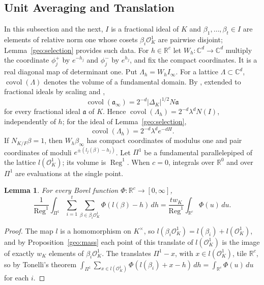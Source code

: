 \documentclass[11pt]{amsart}
\numberwithin{equation}{section}
\newtheorem{lemma}[equation]{Lemma}
\theoremstyle{definition}
\theoremstyle{remark}
\DeclareMathOperator{\covol}{covol}
\newcommand{\R}{\mathbb R}
\newcommand{\C}{\mathbb C}
\begin{document}
\subsection{Unit Averaging and Translation}
In this subsection and the next, $I$ is a fractional ideal of $K$ and
$\beta_1,\dots,\beta_t\in I$ are elements of relative norm one whose
cosets $\beta_i\mathcal O_K^1$ are pairwise disjoint;
Lemma~\ref{geo:selection} provides such data. For $h\in\R^c$ let
$W_h\colon\C^d\to\C^d$ multiply the coordinate $\phi_j^+$ by
$e^{-h_j}$ and $\phi_j^-$ by $e^{h_j}$, and fix the compact
coordinates. It is a real diagonal map of determinant one. Put
$\Lambda_h=W_hI_\infty$. For a lattice $\Lambda\subset\C^d$,
$\covol(\Lambda)$ denotes the volume of a fundamental domain. By
\cite[Proposition~4.26]{MilneANT}, extended to fractional ideals by
scaling and \cite[Proposition~4.2]{MilneANT},
\begin{equation}\label{geo:covolume}
 \covol(\mathfrak a_\infty)=2^{-d}|\Delta_K|^{1/2}N\mathfrak a
\end{equation}
for every fractional ideal $\mathfrak a$ of $K$. Hence
$\covol(\Lambda_h)=2^{-d}\lambda^dN(I)$, independently of $h$; for the
ideal of Lemma~\ref{geo:selection},
\begin{equation}\label{geo:determinant}
 \covol(\Lambda_h)=2^{-d}\lambda^de^{-dH}.
\end{equation}
If $N_{K/F}\beta=1$, then $W_h\beta_\infty$ has compact coordinates of
modulus one and pair coordinates of moduli $e^{\pm(l_j(\beta)-h_j)}$.
Let $\Pi^1$ be a fundamental parallelepiped of the lattice
$l(\mathcal O_K^1)$; its volume is $\operatorname{Reg}^1$. When $c=0$,
integrals over $\R^0$ and over $\Pi^1$ are evaluations at the single
point.

\begin{lemma}\label{geo:unfold-lemma}
For every Borel function $\Phi\colon\R^c\to[0,\infty]$,
\begin{equation}\label{geo:unfold}
 \frac1{\operatorname{Reg}^1}\int_{\Pi^1}\sum_{i=1}^t
 \sum_{\beta\in\beta_i\mathcal O_K^1}\Phi(l(\beta)-h)\,dh
 =\frac{tw_K}{\operatorname{Reg}^1}\int_{\R^c}\Phi(u)\,du .
\end{equation}
\end{lemma}

\begin{proof}
The map $l$ is a homomorphism on $K^\times$, so
$l(\beta_i\mathcal O_K^1)=l(\beta_i)+l(\mathcal O_K^1)$, and by
Proposition~\ref{geo:mass} each point of this translate of
$l(\mathcal O_K^1)$ is the image of exactly $w_K$ elements of
$\beta_i\mathcal O_K^1$. The translates $\Pi^1-x$, with
$x\in l(\mathcal O_K^1)$, tile $\R^c$, so by Tonelli's theorem
$\int_{\Pi^1}\sum_{x\in l(\mathcal
O_K^1)}\Phi(l(\beta_i)+x-h)\,dh=\int_{\R^c}\Phi(u)\,du$ for each
$i$.
\end{proof}
\end{document}
